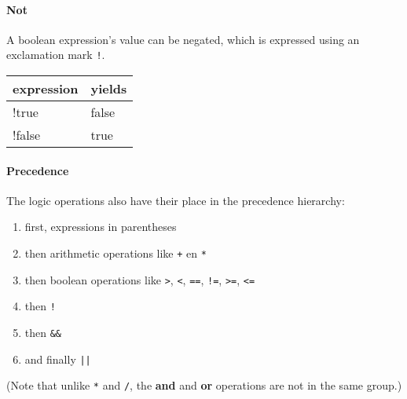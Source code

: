 \paragraph{Not}

A boolean expression's value can be negated, which is expressed using an exclamation mark \texttt{!}.

\begin{center}
  \ttfamily
  \begin{tabular}{l@{\qquad}l}
    {\normalfont expression} & {\normalfont yields} \\
    \midrule
    !true   & false \\
    !false  & true \\
    \midrule
  \end{tabular}
\end{center}

\paragraph{Precedence}

The logic operations also have their place in the precedence hierarchy:

\begin{enumerate}
  \item first, expressions in parentheses
  \item then arithmetic operations like \texttt{+} en \texttt{*}
  \item then boolean operations like \texttt{>}, \texttt{<}, \texttt{==}, \texttt{!=}, \texttt{>=}, \texttt{<=}
  \item then \texttt{!}
  \item then \texttt{\&\&}
  \item and finally \texttt{||}
\end{enumerate}

(Note that unlike \texttt{*} and \texttt{/}, the \textbf{and} and \textbf{or} operations are not in the same group.)
